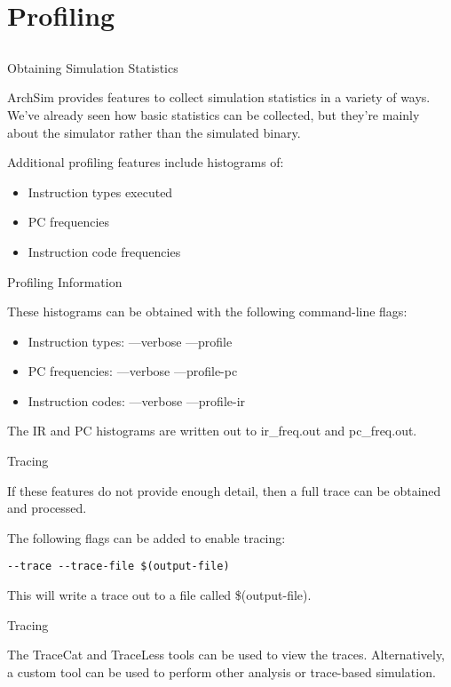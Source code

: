 \section{Profiling}
\subsection{}

\begin{frame}{Obtaining Simulation Statistics}

ArchSim provides features to collect simulation statistics in a variety
of ways. We've already seen how basic statistics can be collected, but
they're mainly about the simulator rather than the simulated binary.

Additional profiling features include histograms of:
\begin{itemize}
\item Instruction types executed
\item PC frequencies
\item Instruction code frequencies
\end{itemize}

\end{frame}

\begin{frame}{Profiling Information}

These histograms can be obtained with the following command-line flags:

\begin{itemize}
\item Instruction types: {\ttfamily ---verbose ---profile}
\item PC frequencies: {\ttfamily ---verbose ---profile-pc}
\item Instruction codes: {\ttfamily ---verbose ---profile-ir}
\end{itemize}

The IR and PC histograms are written out to ir\_freq.out and pc\_freq.out.

\end{frame}

\begin{frame}[fragile]{Tracing}

If these features do not provide enough detail, then a full trace can
be obtained and processed.

The following flags can be added to enable tracing:

\begin{lstlisting}
--trace --trace-file $(output-file)
\end{lstlisting}

This will write a trace out to a file called \$(output-file).

\end{frame}

\begin{frame}{Tracing}

The TraceCat and TraceLess tools can be used to view the traces. 
Alternatively, a custom tool can be used to perform other analysis or
trace-based simulation.

\end{frame}
